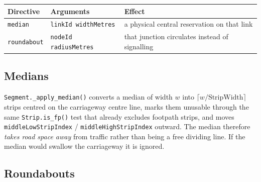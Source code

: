\documentclass[11pt, a4paper]{article}
\newcommand{\code}[1]{\texttt{#1}}
\begin{document}
\begin{center}
\begin{tabularx}{\textwidth}{l l X}
\toprule
\textbf{Directive} & \textbf{Arguments} & \textbf{Effect} \\
\midrule
\code{median} & \code{linkId widthMetres} & a physical central reservation on that link \\
\code{roundabout} & \code{nodeId radiusMetres} & that junction circulates instead of signalling \\
\bottomrule
\end{tabularx}
\end{center}

\subsection{Medians}

\code{Segment.\_apply\_median()} converts a median of width $w$ into
$\lceil w / \text{StripWidth} \rceil$ strips centred on the carriageway centre
line, marks them unusable through the same \code{Strip.is\_fp()} test that
already excludes footpath strips, and moves \code{middleLowStripIndex} /
\code{middleHighStripIndex} outward. The median therefore \emph{takes road space
away} from traffic rather than being a free dividing line. If the median would
swallow the carriageway it is ignored.

\subsection{Roundabouts}
\end{document}
